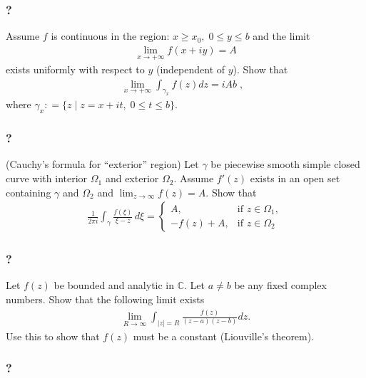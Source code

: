 \hypertarget{section-137}{%
\subsubsection{?}\label{section-137}}

Assume \(f\) is continuous in the region:
\(x \geq x_0, \; 0 \leq y \leq b\) and the limit
\begin{align*}\displaystyle \lim_{x \rightarrow + \infty} f(x + iy) = A\end{align*}
exists uniformly with respect to \(y\) (independent of \(y\)). Show that
\begin{align*}\lim_{x \rightarrow + \infty} \int_{\gamma_x} f(z) dz  = iA b \; , \; \;\end{align*}
where \(\gamma_x : = \{ z \; | \; z = x + it, \; 0 \leq t \leq b\}.\)

\hypertarget{section-138}{%
\subsubsection{?}\label{section-138}}

(Cauchy's formula for ``exterior'' region) Let \(\gamma\) be piecewise
smooth simple closed curve with interior \(\Omega_1\) and exterior
\(\Omega_2\). Assume \(f'(z)\) exists in an open set containing
\(\gamma\) and \(\Omega_2\) and
\(\lim_{z \rightarrow \infty } f(z) = A\). Show that
\begin{align*}\frac{1}{2 \pi i} \int_\gamma \frac{f(\xi)}{\xi - z} \, d \xi =
\begin{cases}
A,          &     \text{if\ $z \in \Omega_1$}, \\
-f (z) + A, &  \text{if\ $z \in \Omega_2$}
\end{cases}\end{align*}

\hypertarget{section-139}{%
\subsubsection{?}\label{section-139}}

Let \(f(z)\) be bounded and analytic in \(\mathbb C\). Let \(a \neq b\)
be any fixed complex numbers. Show that the following limit exists
\begin{align*}\lim_{R \rightarrow \infty} \int_{|z|=R} \frac{f(z)}{(z-a)(z-b)} dz.\end{align*}
Use this to show that \(f(z)\) must be a constant (Liouville's theorem).

\hypertarget{section-140}{%
\subsubsection{?}\label{section-140}}

